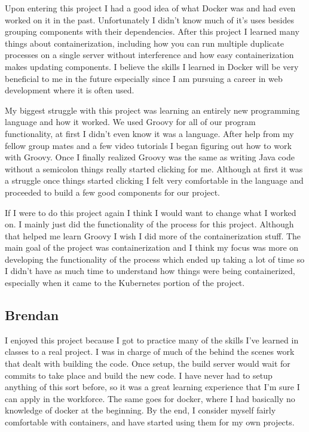 \documentclass[onecolumn, draftclsnofoot,10pt, compsoc]{IEEEtran}
\begin{document}
Upon entering this project I had a good idea of what Docker was and had even worked on it in the past. Unfortunately I didn't know much of it's uses besides grouping components with their dependencies. After this project I learned many things about containerization, including how you can run multiple duplicate processes on a single server without interference and how easy containerization makes updating components. I believe the skills I learned in Docker will be very beneficial to me in the future especially since I am pursuing a career in web development where it is often used.

My biggest struggle with this project was learning an entirely new programming language and how it worked. We used Groovy for all of our program functionality, at first I didn't even know it was a language. After help from my fellow group mates and a few video tutorials I began figuring out how to work with Groovy. Once I finally realized Groovy was the same as writing Java code without a semicolon things really started clicking for me. Although at first it was a struggle once things started clicking I felt very comfortable in the language and proceeded to build a few good components for our project.

If I were to do this project again I think I would want to change what I worked on. I mainly just did the functionality of the process for this project. Although that helped me learn Groovy I wish I did more of the containerization stuff. The main goal of the project was containerization and I think my focus was more on developing the functionality of the process which ended up taking a lot of time so I didn't have as much time to understand how things were being containerized, especially when it came to the Kubernetes portion of the project.

\subsection{Brendan}
I enjoyed this project because I got to practice many of the skills I've learned in classes to a real project.
I was in charge of much of the behind the scenes work that dealt with building the code.
Once setup, the build server would wait for commits to take place and build the new code.
I have never had to setup anything of this sort before, so it was a great learning experience that I'm sure I can apply in the workforce.
The same goes for docker, where I had basically no knowledge of docker at the beginning.
By the end, I consider myself fairly comfortable with containers, and have started using them for my own projects.
\end{document}
